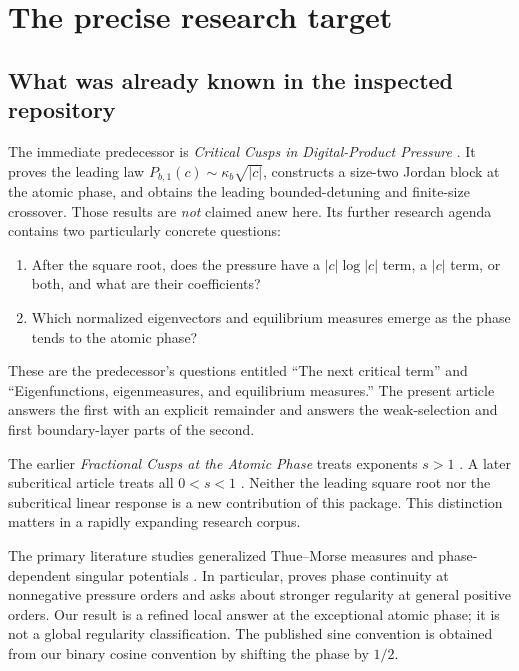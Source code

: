 \documentclass[11pt,a4paper]{article}
\numberwithin{equation}{section}
\theoremstyle{definition}
\theoremstyle{remark}
\begin{document}
\section{The precise research target}
\label{sec:intro}

\subsection{What was already known in the inspected repository}
The immediate predecessor is \emph{Critical Cusps in Digital-Product
Pressure} \cite{CriticalRepo}. It proves the leading law
$P_{b,1}(c)\sim\kappa_b\sqrt{|c|}$, constructs a size-two Jordan block at
the atomic phase, and obtains the leading bounded-detuning and finite-size
crossover. Those results are \emph{not} claimed anew here. Its further
research agenda contains two particularly concrete questions:
\begin{enumerate}[label=\arabic*.,leftmargin=2em]
\item After the square root, does the pressure have a
$|c|\log|c|$ term, a $|c|$ term, or both, and what are their coefficients?
\item Which normalized eigenvectors and equilibrium measures emerge as
the phase tends to the atomic phase?
\end{enumerate}
These are the predecessor's questions entitled ``The next critical term''
and ``Eigenfunctions, eigenmeasures, and equilibrium measures.'' The
present article answers the first with an explicit remainder and answers
the weak-selection and first boundary-layer parts of the second.

The earlier \emph{Fractional Cusps at the Atomic Phase} treats exponents
$s>1$ \cite{FractionalRepo}. A later subcritical article treats all
$0<s<1$ \cite{SubcriticalRepo}. Neither the leading square root nor the
subcritical linear response is a new contribution of this package.
This distinction matters in a rapidly expanding research corpus.

The primary literature studies generalized Thue--Morse measures and
phase-dependent singular potentials \cite{GKS,GLS}. In particular,
\cite[Theorems 2.2--2.3 and the following discussion]{GLS} proves
phase continuity at nonnegative pressure orders and asks about stronger
regularity at general positive orders. Our result is a refined local
answer at the exceptional atomic phase; it is not a global regularity
classification. The published sine convention is obtained from our
binary cosine convention by shifting the phase by $1/2$.
\end{document}
